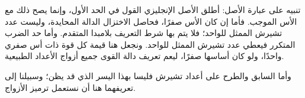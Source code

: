 \documentclass[../../../include/open-logic-section]{subfiles}
\begin{document}
تنبيه على عبارة الأصل: أطلق الأصل الإنجليزي القول في الحد الأول،
وإنما يصح ذلك مع الأس الموجب. فأما إن كان الأس صفرًا، فحاصل الاختزال
الدالة المحايدة، وليست عدد تشيرش الممثل للواحد؛ فلا يتم بها شرط
التعريف بلامبدا المتقدم. وأما حد الضرب المتكرر فيعطي عدد تشيرش
الممثل للواحد. ونجعل هنا قيمة كل قوة ذات أس صفري واحدًا، ولو كان
أساسها صفرًا، ليعم تعريف دالة القوى جميع أزواج الأعداد الطبيعية.

وأما السابق والطرح على أعداد تشيرش فليسا بهذا اليسر الذي قد يظن؛
وسبيلنا إلى تعريفهما هنا أن نستعمل ترميز الأزواج.
\end{document}
